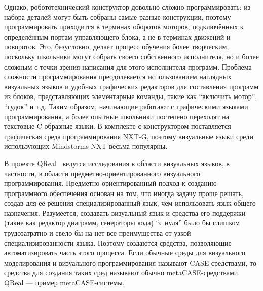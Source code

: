 \documentclass[a4paper]{article}
\begin{document}
Однако, робототехнический конструктор довольно сложно программировать: из набора деталей могут быть собраны самые разные конструкции, поэтому программировать приходится в терминах оборотов моторов, подключённых к определённым портам управляющего блока, а не в терминах движений и поворотов. Это, безусловно, делает процесс обучения более творческим, поскольку школьники могут собрать своего собственного исполнителя, но и более сложным с точки зрения написания для этого исполнителя программ. Проблема сложности программирования преодолевается использованием наглядных визуальных языков и удобных графических редакторов для составления программ из блоков, представляющих элементарные команды, такие как ``включить мотор'', ``гудок'' и т.д. Таким образом, начинающие работают с графическими языками программирования, а более опытные школьники постепено переходят на текстовые C-образные языки. В комплекте с конструктором поставляется графическая среда программирования NXT-G, поэтому визуальные языки среди использующих Mindstorms NXT весьма популярны.

В проекте QReal~\cite{qReal} ведутся исследования в области визуальных языков, в частности, в области предметно-ориентированного визуального программирования. Предметно-ориентированный подход к созданию программного обеспечения основан на том, что иногда задачу проще решать, создав для её решения специализированный язык, чем использовать язык общего назначения. Разумеется, создавать визуальный язык и средства его поддержки (такие как редактор диаграмм, генераторы кода) ``с нуля'' было бы слишком трудозатратно и свело бы на нет все преимущества от узкой специализированности языка. Поэтому создаются средства, позволяющие автоматизировать часть этого процесса. Если обычные среды для визуального моделирования и визуального программирования называют CASE-средствами, то средства для создания таких сред называют обычно metaCASE-средствами. QReal --- пример metaCASE-системы.
\end{document}
